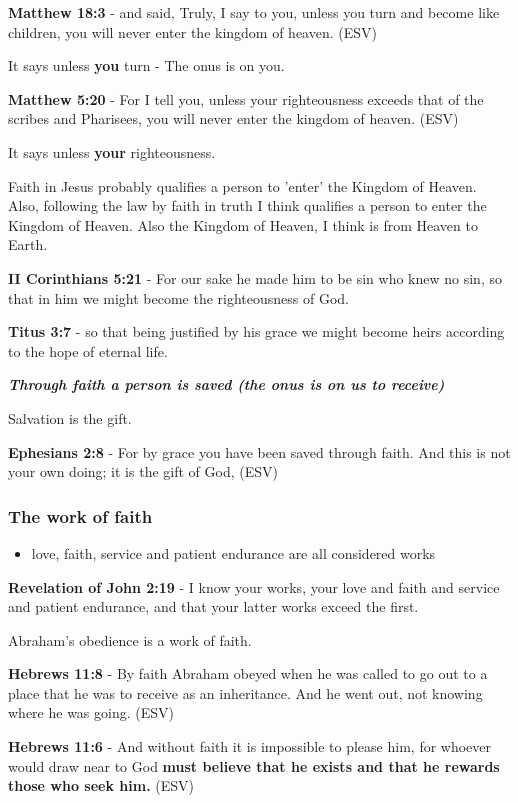 \documentclass[11pt]{article}
\begin{document}
\textbf{Matthew 18:3} -  and said, Truly, I say to you, unless you turn and become like children, you will never enter the kingdom of heaven.  (ESV)

It says unless \textbf{you} turn - The onus is on you.

\textbf{Matthew 5:20} - For I tell you, unless your righteousness exceeds that of the scribes and Pharisees, you will never enter the kingdom of heaven. (ESV)

It says unless \textbf{your} righteousness.

Faith in Jesus probably qualifies a person to 'enter' the Kingdom of Heaven.
Also, following the law by faith in truth I think qualifies a person to enter the Kingdom of Heaven.
Also the Kingdom of Heaven, I think is from Heaven to Earth.

\textbf{II Corinthians 5:21} - For our sake he made him to be sin who knew no sin, so that in him we might become the righteousness of God.

\textbf{Titus 3:7} - so that being justified by his grace we might become heirs according to the hope of eternal life.

\emph{\textbf{Through faith a person is saved (the onus is on us to receive)}}

Salvation is the gift.

\textbf{Ephesians 2:8} - For by grace you have been saved through faith.  And this is not your own doing; it is the gift of God,  (ESV)

\subsubsection{The work of faith}
\label{sec:org1f37cb3}
\begin{itemize}
\item love, faith, service and patient endurance are all considered works
\end{itemize}

\textbf{Revelation of John 2:19} - I know your works, your love and faith and service and patient endurance, and that your latter works exceed the first.

Abraham's obedience is a work of faith.

\textbf{Hebrews 11:8} - By faith Abraham obeyed when he was called to go out to a place that he was to receive as an inheritance. And he went out, not knowing where he was going. (ESV)

\textbf{Hebrews 11:6} - And without faith it is impossible to please him, for whoever would draw near to God \textbf{must believe that he exists and that he rewards those who seek him.} (ESV)
\end{document}
